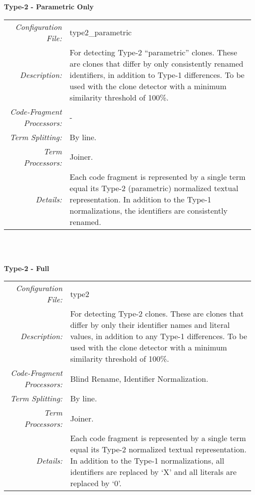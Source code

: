 \documentclass[]{article}
\begin{document}
		\noindent\begin{minipage}{\textwidth}
		\noindent \textbf{Type-2 - Parametric Only}\\
		\begin{tabular}{rp{12.5cm}}
			\bottomrule[2pt]
			\textit{Configuration File:} & type2\_parametric \\
			\textit{Description:}       & For detecting Type-2 ``parametric'' clones.  These are clones that differ by only consistently renamed identifiers, in addition to Type-1 differences.  To be used with the clone detector with a minimum similarity threshold of 100\%. \\
			\midrule
			\textit{Code-Fragment Processors:} & - \\
			\textit{Term Splitting:}  & By line.\\
			\textit{Term Processors:} & Joiner.\\
			\midrule
			\textit{Details:}         & Each code fragment is represented by a single term equal its Type-2 (parametric) normalized textual representation.  In addition to the Type-1 normalizations, the identifiers are consistently renamed.\\
			\bottomrule[2pt]
		\end{tabular} \\\\
		\end{minipage}
		
		\noindent\begin{minipage}{\textwidth}
		\textbf{Type-2 - Full}\\
		\begin{tabular}{rp{12.5cm}}
		\bottomrule[2pt]
			\textit{Configuration File:} & type2 \\
			\textit{Description:}       & For detecting Type-2 clones.  These are clones that differ by only their identifier names and literal values, in addition to any Type-1 differences.  To be used with the clone detector with a minimum similarity threshold of 100\%. \\
		\midrule
			\textit{Code-Fragment Processors:} & Blind Rename, Identifier Normalization. \\
			\textit{Term Splitting:}  & By line.\\
			\textit{Term Processors:} & Joiner.\\
		\midrule
			\textit{Details:}         & Each code fragment is represented by a single term equal its Type-2 normalized textual representation.  In addition to the Type-1 normalizations, all identifiers are replaced by `X' and all literals are replaced by `0'.\\
		\bottomrule[2pt]
		\end{tabular} \\\\
		\end{minipage}
		
\end{document}
